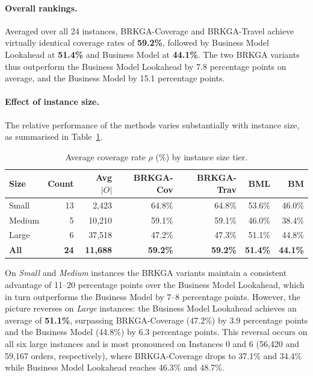 \paragraph{Overall rankings.}
Averaged over all 24 instances, BRKGA-Coverage and BRKGA-Travel
achieve virtually identical coverage rates of \textbf{59.2\%},
followed by Business Model Lookahead at \textbf{51.4\%} and
Business Model at \textbf{44.1\%}.
The two BRKGA variants thus outperform the Business Model Lookahead
by 7.8 percentage points on average, and the Business Model by
15.1 percentage points.

\paragraph{Effect of instance size.}
The relative performance of the methods varies substantially with
instance size, as summarised in Table~\ref{tab:results_by_size}.

\begin{table}[ht]
\centering
\caption{Average coverage rate $\rho$ (\%) by instance size tier.}
\label{tab:results_by_size}
\small
\begin{tabular}{lrrrrrr}
\toprule
\textbf{Size} & \textbf{Count} & \textbf{Avg $|O|$} &
\textbf{BRKGA-Cov} & \textbf{BRKGA-Trav} &
\textbf{BML} & \textbf{BM} \\
\midrule
Small  & 13 & 2{,}423 & 64.8\% & 64.8\% & 53.6\% & 46.0\% \\
Medium &  5 & 10{,}210 & 59.1\% & 59.1\% & 46.0\% & 38.4\% \\
Large  &  6 & 37{,}518 & 47.2\% & 47.3\% & 51.1\% & 44.8\% \\
\midrule
\textbf{All} & \textbf{24} & \textbf{11{,}688} & \textbf{59.2\%} & \textbf{59.2\%} & \textbf{51.4\%} & \textbf{44.1\%} \\
\bottomrule
\end{tabular}
\end{table}

On \emph{Small} and \emph{Medium} instances the BRKGA variants
maintain a consistent advantage of 11--20 percentage points over
the Business Model Lookahead, which in turn outperforms the
Business Model by 7--8 percentage points.
However, the picture reverses on \emph{Large} instances:
the Business Model Lookahead achieves an average of \textbf{51.1\%},
surpassing BRKGA-Coverage (47.2\%) by 3.9 percentage points
and the Business Model (44.8\%) by 6.3 percentage points.
This reversal occurs on all six large instances and is most
pronounced on Instances 0 and 6
(56{,}420 and 59{,}167 orders, respectively),
where BRKGA-Coverage drops to 37.1\% and 34.4\% while
Business Model Lookahead reaches 46.3\% and 48.7\%.

